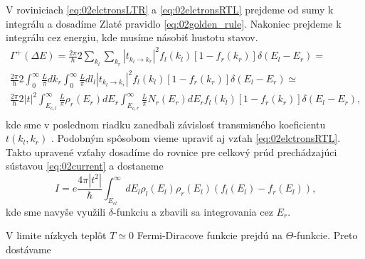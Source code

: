 V roviniciach \eqref{eq:02elctronsLTR} a \eqref{eq:02elctronsRTL}  prejdeme od sumy k integrálu a dosadíme Zlaté pravidlo \eqref{eq:02golden_rule}. Nakoniec prejdeme k integrálu cez energiu, kde musíme násobiť hustotu stavov.
\begin{align*}
\Gamma^+(\Delta E)=\frac{2\pi}{\hbar}2\sum_{k_l} \sum_{k_r} {|t_{k_l \to k_r}|^2f_l(k_l)[1-f_r(k_r)]\delta(E_{l}-E_{r})}= \\
\frac{2\pi}{\hbar}2 \int_{0}^{\infty}\frac{L}{\pi} dk_{r}\int_{0}^{\infty}\frac{L}{\pi} dl_{l} {|t_{k_l \to k_r}|^2f_l(k_l)[1-f_r(k_r)]\delta(E_{l}-E_{r})} \simeq\\
 \frac{2\pi}{\hbar}2 |t|^2 \int_{E_{c,l}}^{\infty}\frac{L}{\pi}\rho_r(E_r)dE_r\int_{E_{c,r}}^{\infty}\frac{L}{\pi} N_r(E_r)dE_r {f_l(k_l)[1-f_r(k_r)]\delta(E_{l}-E_{r})} \text{,}\\
\end{align*}
kde sme v poslednom riadku zanedbali závislosť transmisného koeficientu $t(k_l,k_r)$ . Podobným spôsobom vieme upraviť aj vzťah \eqref{eq:02elctronsRTL}.
Takto upravené vzťahy dosadíme do rovnice pre celkový prúd prechádzajúci sústavou \eqref{eq:02current} a dostaneme 
\begin{equation}
\label{eq:02current2}
I=e\frac{4\pi|t^2|}{\hbar}\int_{E_{cl}}^\infty dE_l\rho_l(E_l)\rho_r(E_l)(f_l(E_l)-f_r(E_l)) \text{,}
\end{equation}
kde sme navyše využili $\delta$-funkciu a zbavili sa integrovania cez $E_r$. 


V limite nízkych teplôt $T \simeq 0$ Fermi-Diracove funkcie prejdú na $\Theta$-funkcie. Preto dostávame
